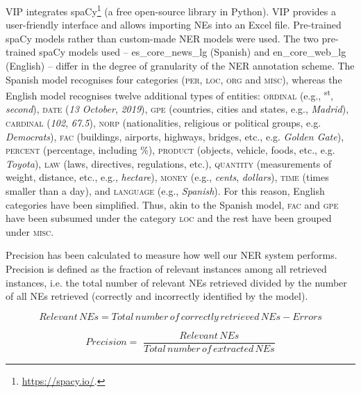 \documentclass[output=paper]{langscibook}
\begin{document}
VIP integrates spaCy\footnote{\url{https://spacy.io/}.} (a free open-source library in Python). VIP provides a user-friendly interface and allows importing NEs into an Excel file. Pre-trained spaCy models rather than custom-made NER models were used. The two pre-trained spaCy models used -- es\_core\_news\_lg (Spanish) and en\_core\_web\_lg (English) -- differ in the degree of granularity of the NER annotation scheme. The Spanish model recognises four categories (\textsc{per, loc, org} and \textsc{misc}), whereas the English model recognises twelve additional types of entities: \textsc{ordinal} (e.g., \textsuperscript{s}\textsuperscript{t}, \textit{second}), \textsc{date} (\textit{13 October}, \textit{2019}), \textsc{gpe} (countries, cities and states, e.g., \textit{Madrid}), \textsc{cardinal} (\textit{102}, \textit{67.5}), \textsc{norp} (nationalities, religious or political groups, e.g. \textit{Democrats}), \textsc{fac} (buildings, airports, highways, bridges, etc., e.g. \textit{Golden Gate}), \textsc{percent} (percentage, including \%), \textsc{product} (objects, vehicle, foods, etc., e.g. \textit{Toyota}), \textsc{law} (laws, directives, regulations, etc.), \textsc{quantity} (measurements of weight, distance, etc., e.g., \textit{hectare}), \textsc{money} (e.g., \textit{cents}, \textit{dollars}), \textsc{time} (times smaller than a day), and \textsc{language} (e.g., \textit{Spanish}). For this reason, English categories have been simplified. Thus, akin to the Spanish model, \textsc{fac} and \textsc{gpe} have been subsumed under the category \textsc{loc} and the rest have been grouped under \textsc{misc}.

Precision has been calculated to measure how well our NER system performs. Precision is defined as the fraction of relevant instances among all retrieved instances, i.e. the total number of relevant NEs retrieved divided by the number of all NEs retrieved (correctly and incorrectly identified by the model). 

\begin{equation*}
\mathit{Relevant}\,\mathit{NEs}=\mathit{Total}\,\mathit{number}\,\mathit{of}\,\mathit{correctly}\, \mathit{retrieved}\,\mathit{NEs}-\mathit{Errors}
\end{equation*}

\begin{equation*}
\mathit{Precision}=\text{~}\frac{\mathit{Relevant}\,\mathit{NEs}}{\mathit{Total}\,\mathit{number}\, \mathit{of}\,\mathit{extracted}\,\mathit{NEs}}
\end{equation*}
\end{document}
